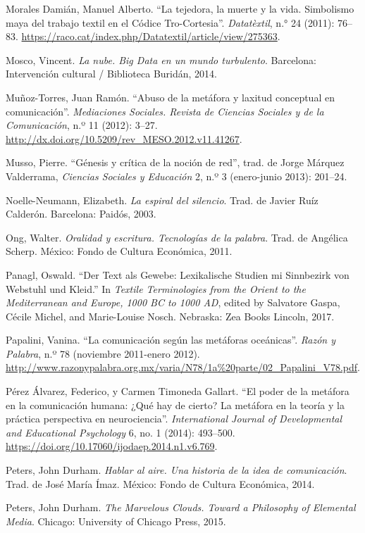 \documentclass{tufte-handout}
\begin{document}
\begin{hangparas}{.25in}{1}
Morales Damián, Manuel Alberto. ``La tejedora, la muerte y la vida.
Simbolismo maya del trabajo textil en el Códice Tro-Cortesia''.
\emph{Datatèxtil}, n.° 24 (2011): 76--83.
\url{https://raco.cat/index.php/Datatextil/article/view/275363}.

Mosco, Vincent. \emph{La nube. Big Data en un mundo turbulento}.
Barcelona: Intervención cultural / Biblioteca Buridán, 2014.

Muñoz-Torres, Juan Ramón. ``Abuso de la metáfora y laxitud conceptual en
comunicación''. \emph{Mediaciones Sociales. Revista de Ciencias Sociales
y de la Comunicación}, n.º 11 (2012): 3--27.
\url{http://dx.doi.org/10.5209/rev_MESO.2012.v11.41267}.

Musso, Pierre. ``Génesis y crítica de la noción de red'', trad. de Jorge
Márquez Valderrama, \emph{Ciencias Sociales y Educación} 2, n.º 3
(enero-junio 2013): 201--24.

Noelle-Neumann, Elizabeth. \emph{La espiral del silencio}. Trad. de
Javier Ruíz Calderón. Barcelona: Paidós, 2003.

Ong, Walter. \emph{Oralidad y escritura. Tecnologías de la palabra}.
Trad. de Angélica Scherp. México: Fondo de Cultura Económica, 2011.

Panagl, Oswald. ``Der Text als Gewebe: Lexikalische Studien mi
Sinnbezirk von Webstuhl und Kleid.'' In \emph{Textile Terminologies from
the Orient to the Mediterranean and Europe, 1000 BC to 1000 AD}, edited
by Salvatore Gaspa, Cécile Michel, and Marie-Louise Nosch. Nebraska: Zea
Books Lincoln, 2017.

Papalini, Vanina. ``La comunicación según las metáforas oceánicas''.
\emph{Razón y Palabra}, n.º 78 (noviembre 2011-enero 2012).
\url{http://www.razonypalabra.org.mx/varia/N78/1a\%20parte/02_Papalini_V78.pdf}.

Pérez Álvarez, Federico, y Carmen Timoneda Gallart. ``El poder de la
metáfora en la comunicación humana: ¿Qué hay de cierto? La metáfora en
la teoría y la práctica perspectiva en neurociencia''.
\emph{International Journal of Developmental and Educational Psychology}
6, no. 1 (2014): 493--500.
\url{https://doi.org/10.17060/ijodaep.2014.n1.v6.769}.

Peters, John Durham. \emph{Hablar al aire. Una historia de la idea de
comunicación}. Trad. de José María Ímaz. México: Fondo de Cultura
Económica, 2014.

Peters, John Durham. \emph{The Marvelous Clouds. Toward a Philosophy of
Elemental Media}. Chicago: University of Chicago Press, 2015.


\end{hangparas}
\end{document}
